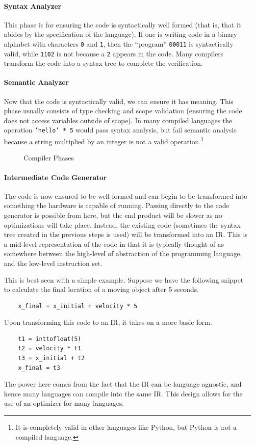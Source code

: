 \paragraph{Syntax Analyzer}
This phase is for ensuring the code is syntactically well formed (that is, that it abides by the specification of the language).
If one is writing code in a binary alphabet with characters \texttt{0} and \texttt{1}, then the ``program'' \texttt{00011} is syntactically valid, while \texttt{1102} is not because a \texttt{2} appears in the code.
Many compilers transform the code into a syntax tree to complete the verification.

\paragraph{Semantic Analyzer}
Now that the code is syntactically valid, we can ensure it has meaning.
This phase usually consists of type checking and scope validation (ensuring the code does not access variables outside of scope).
In many compiled languages the operation \texttt{'hello' * 5} would pass syntax analysis, but fail semantic analysis because a string multiplied by an integer is not a valid operation.\footnote{It is completely valid in other languages like Python, but Python is not a compiled language.}

\begin{figure} %
    \centering
    
    \caption{Compiler Phases}\label{fig:compilerphases} %
\end{figure}

\paragraph{Intermediate Code Generator}
The code is now ensured to be well formed and can begin to be transformed into something the hardware is capable of running.
Passing directly to the code generator is possible from here, but the end product will be slower as no optimizations will take place.
Instead, the existing code (sometimes the syntax tree created in the previous steps is used) will be transformed into an \acf{IR}.
This is a mid-level representation of the code in that it is typically thought of as somewhere between the high-level of abstraction of the programming language, and the low-level instruction set.

This is best seen with a simple example.
Suppose we have the following snippet to calculate the final location of a moving object after 5 seconds.
\begin{lstlisting}
    x_final = x_initial + velocity * 5
\end{lstlisting}
Upon transforming this code to an \ac{IR}, it takes on a more basic form.
\begin{lstlisting}
    t1 = inttofloat(5)
    t2 = velocity * t1
    t3 = x_initial + t2
    x_final = t3
\end{lstlisting}
The power here comes from the fact that the \acf{IR} can be language agnostic, and hence many languages can compile into the same \ac{IR}.
This design allows for the use of an optimizer for many languages.

